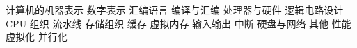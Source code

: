 \markdownRendererUlBegin
\markdownRendererUlItem 计算机的机器表示\markdownRendererInterblockSeparator
{}\markdownRendererUlBeginTight
\markdownRendererUlItem 数字表示\markdownRendererUlItemEnd 
\markdownRendererUlItem 汇编语言\markdownRendererUlItemEnd 
\markdownRendererUlItem 编译与汇编\markdownRendererUlItemEnd 
\markdownRendererUlEndTight \markdownRendererUlItemEnd 
\markdownRendererUlItem 处理器与硬件\markdownRendererInterblockSeparator
{}\markdownRendererUlBeginTight
\markdownRendererUlItem 逻辑电路设计\markdownRendererUlItemEnd 
\markdownRendererUlItem CPU 组织\markdownRendererUlItemEnd 
\markdownRendererUlItem 流水线\markdownRendererUlItemEnd 
\markdownRendererUlEndTight \markdownRendererUlItemEnd 
\markdownRendererUlItem 存储组织\markdownRendererInterblockSeparator
{}\markdownRendererUlBeginTight
\markdownRendererUlItem 缓存\markdownRendererUlItemEnd 
\markdownRendererUlItem 虚拟内存\markdownRendererUlItemEnd 
\markdownRendererUlEndTight \markdownRendererUlItemEnd 
\markdownRendererUlItem 输入输出\markdownRendererInterblockSeparator
{}\markdownRendererUlBeginTight
\markdownRendererUlItem 中断\markdownRendererUlItemEnd 
\markdownRendererUlItem 硬盘与网络\markdownRendererUlItemEnd 
\markdownRendererUlEndTight \markdownRendererUlItemEnd 
\markdownRendererUlItem 其他\markdownRendererInterblockSeparator
{}\markdownRendererUlBeginTight
\markdownRendererUlItem 性能\markdownRendererUlItemEnd 
\markdownRendererUlItem 虚拟化\markdownRendererUlItemEnd 
\markdownRendererUlItem 并行化\markdownRendererUlItemEnd 
\markdownRendererUlEndTight \markdownRendererUlItemEnd 
\markdownRendererUlEnd \markdownRendererInterblockSeparator
{}\relax